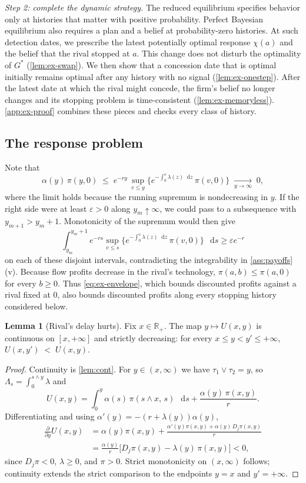 \documentclass[12pt,reqno]{article}
\newcommand{\de}{\mathop{}\!\mathrm{d}}
\newcommand{\e}{\varepsilon}
\newcommand{\R}{\mathbb{R}}
\theoremstyle{definition} \newtheorem{example}{Example}
\theoremstyle{definition} \newtheorem{condition}{Condition}
\theoremstyle{definition} \newtheorem{corollary}{Corollary}
\theoremstyle{definition} \newtheorem{claim}{Claim}
\theoremstyle{definition} \newtheorem{definition}{Definition}
\theoremstyle{definition} \newtheorem{conjecture}{Conjecture}
\theoremstyle{definition} \newtheorem{Lemma}{Lemma}
\theoremstyle{definition} \newtheorem{lemma}{Lemma}
\theoremstyle{plain} \newtheorem{theorem}{Theorem}
\theoremstyle{definition} \newtheorem{assumption}{Assumption}
\theoremstyle{definition} \newtheorem*{assumptionnonumber}{Assumption}
\theoremstyle{definition} \newtheorem*{theoremNoNumber}{Proposition}
\theoremstyle{definition}
\theoremstyle{definition}\newtheorem{proposition}{Proposition}
\theoremstyle{definition} \newtheorem{result}{Result}
\theoremstyle{definition} \newtheorem*{definitionNoNumber}{Definition}
\theoremstyle{definition} \newtheorem{Definition}{Definition}
\theoremstyle{definition} \newtheorem*{DefinitionNoNumber}{Definition}
\theoremstyle{definition} \newtheorem*{fact}{Fact}
\theoremstyle{definition} \newtheorem*{property}{Property}
\theoremstyle{definition} \newtheorem{remark}{Remark}
\begin{document}
\emph{Step 2: complete the dynamic strategy.} The reduced equilibrium specifies behavior only at histories that matter with positive probability. Perfect Bayesian equilibrium also requires a plan and a belief at probability-zero histories. At such detection dates, we prescribe the latest potentially optimal response $\chi(a)$ and the belief that the rival stopped at $a$. This change does not disturb the optimality of $G^\ast$ (\cref{lem:ex-swap}). We then show that a concession date that is optimal initially remains optimal after any history with no signal (\cref{lem:ex-onestep}). After the latest date at which the rival might concede, the firm's belief no longer changes and its stopping problem is time-consistent (\cref{lem:ex-memoryless}). \cref{app:ex-proof} combines these pieces and checks every class of history.
\subsection{The response problem}\label{app:ex-response}

Note that \begin{equation}\label{eq:ex-envelope}
\alpha(y)\,\pi(y,0)\;\le\;e^{-ry}\,\sup_{v\le y}\Big\{e^{-\int_0^v\lambda(z)\de z}\,\pi(v,0)\Big\}\;\xrightarrow[y\to\infty]{}\;0 ,
\end{equation}
where the limit holds because the running supremum is nondecreasing in $y$. If the right side were at least $\e>0$ along $y_m\uparrow\infty$, we could pass to a subsequence with $y_{m+1}>y_m+1$. Monotonicity of the supremum would then give
\[
\int_{y_m}^{y_m+1}e^{-rs}\sup_{v\le s}
\Big\{e^{-\int_0^v\lambda(z)\de z}\,\pi(v,0)\Big\}\,\de s
\ge \e e^{-r}
\]
on each of these disjoint intervals, contradicting the integrability in \cref{ass:payoffs}(v). Because flow profits decrease in the rival's technology, $\pi(a,b)\leq \pi(a,0)$ for every $b\geq0$. Thus \eqref{eq:ex-envelope}, which bounds discounted profits against a rival fixed at $0$, also bounds discounted profits along every stopping history considered below.
\begin{lemma}[Rival's delay hurts]\label{lem:ex-down}
Fix $x\in\R_+$. The map $y\mapsto U(x,y)$ is continuous on $[x,+\infty]$ and strictly decreasing: for every $x\le y<y'\le+\infty$,
$
U(x,y')\;<\;U(x,y).
$\end{lemma}

\begin{proof}
Continuity is \cref{lem:cont}. For $y\in(x,\infty)$ we have $\tau_1\vee\tau_2=y$, so $\Lambda_s=\int_0^{s\wedge y}\lambda$ and
\[
U(x,y)=\int_0^y \alpha(s)\,\pi(s\wedge x,\,s)\,\de s+\frac{\alpha(y)\,\pi(x,y)}{r}.
\]
Differentiating and using $\alpha'(y)=-(r+\lambda(y))\alpha(y)$,
\begin{align*}
\frac{\partial}{\partial y}U(x,y)
&= \alpha(y)\pi(x,y)+\frac{\alpha'(y)\pi(x,y)+\alpha(y)\,D_j\pi(x,y)}{r}\\
&=\frac{\alpha(y)}{r}\Big[D_j\pi(x,y)-\lambda(y)\,\pi(x,y)\Big]<0,
\end{align*}
since $D_j\pi<0$, $\lambda\ge0$, and $\pi>0$. Strict monotonicity on $(x,\infty)$ follows; continuity extends the strict comparison to the endpoints $y=x$ and $y'=+\infty$.
\end{proof}
\end{document}
